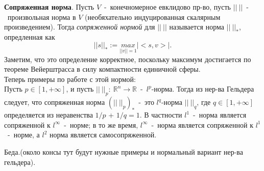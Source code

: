 \textbf{Сопряженная норма}. Пусть $V$~-~конечномерное евклидово пр-во, пусть $||~||$~-~произвольная норма в $V$ (необяхательно индуцированная скалярным произведением). Тогда \textit{сопряженной нормой} для $||~||$ называется норма $||~||_*$, опредленная как
$$
||s||_*:=\underset{||v||=1}{max}|<s,v>|.
$$
Заметим, что это определение корректное, поскольку максимум достигается по теореме Вейерштрасса в силу компактности единичной сферы.\\
Теперь примеры по работе с этой нормой:\\

Пусть $p \in [1,+\infty]$, и пусть $||~||_p:~\mathbb{R}^n \to \mathbb{R}$~-~$l^p$-норма. Тогда из нер-ва Гельдера следует, что сопряженная норма $(||~||_p)_*$~-~это $l^q$-норма $||~||_q$, где $q \in [1, +\infty]$ определяется из неравенства $1/p$ + $1/q=1$. В частности $l^1$~-~норма является сопряженной к $l^{\infty}$~-~норме; в то же время, $l^{\infty}$~-~норма является сопряженной к $l^1$~-~норме, а $l^2$ норма является самосопряженной.

Беда.(около консы тут будут нужные примеры и нормальный вариант нер-ва гельдера).